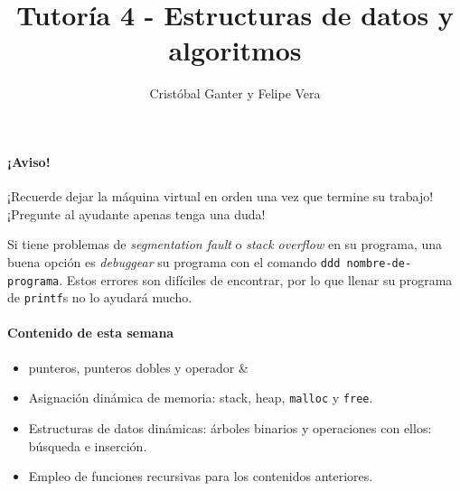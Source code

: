 \documentclass[a4paper,10pt]{article}
\title{Tutoría 4 - Estructuras de datos y algoritmos}
\author{Cristóbal Ganter y Felipe Vera}
\begin{document}
\maketitle

\paragraph{¡Aviso!} ¡Recuerde dejar la máquina virtual en orden una vez que termine su trabajo!
¡Pregunte al ayudante apenas tenga una duda!

Si tiene problemas de \textit{segmentation fault} o \textit{stack overflow} en su programa, una buena opción es \textit{debuggear} su programa con el comando \texttt{ddd nombre-de-programa}.
Estos errores son difíciles de encontrar, por lo que llenar su programa de \texttt{printf}s no lo ayudará mucho.

\paragraph{Contenido de esta semana}
\begin{itemize}
  \item punteros, punteros dobles y operador \&
  \item Asignación dinámica de memoria: stack, heap, \texttt{malloc} y \texttt{free}.
  \item Estructuras de datos dinámicas: árboles binarios y operaciones con ellos: búsqueda e inserción.
  \item Empleo de funciones recursivas para los contenidos anteriores.
\end{itemize}
\end{document}
